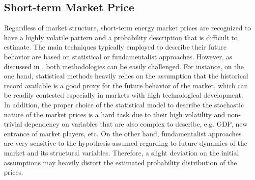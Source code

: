 \subsection{Short-term Market Price}
\label{SpotPrice}

	Regardless of market structure, short-term energy market prices are recognized to have a highly volatile pattern and a probability description that is difficult to estimate. The main techniques typically employed to describe their future behavior are based on statistical or fundamentalist approaches. However, as discussed in \cite{RobustSpotPrice}, both methodologies can be easily challenged. For instance, on the one hand, statistical methods heavily relies on the assumption that the historical record available is a good proxy for the future behavior of the market, which can be readily contested especially in markets with high technological development. In addition, the proper choice of the statistical model to describe the stochastic nature of the market prices is a hard task due to their high volatility and non-trivial dependency on variables that are also complex to describe, e.g. GDP, new entrance of market players, etc. On the other hand, fundamentalist approaches are very sensitive to the hypothesis assumed regarding to future dynamics of the market and its structural variables. Therefore, a slight deviation on the initial assumptions may heavily distort the estimated probability distribution of the prices. 

